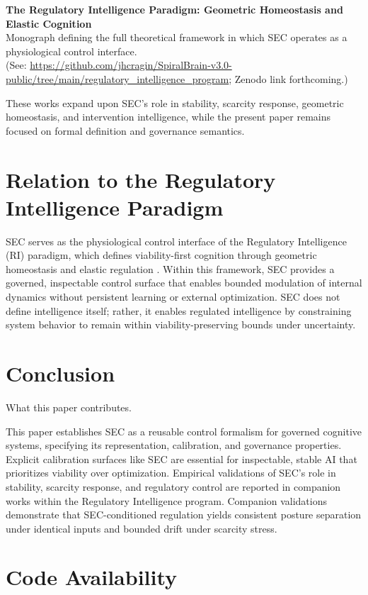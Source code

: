 \documentclass[12pt,a4paper]{article}
\begin{document}
\textbf{The Regulatory Intelligence Paradigm: Geometric Homeostasis and Elastic Cognition} \\
Monograph defining the full theoretical framework in which SEC operates as a physiological control interface. \\
(See: \url{https://github.com/jhcragin/SpiralBrain-v3.0-public/tree/main/regulatory_intelligence_program}; Zenodo link forthcoming.)

These works expand upon SEC's role in stability, scarcity response, geometric homeostasis, and intervention intelligence, while the present paper remains focused on formal definition and governance semantics.

\section{Relation to the Regulatory Intelligence Paradigm}

SEC serves as the physiological control interface of the Regulatory Intelligence (RI) paradigm, which defines viability-first cognition through geometric homeostasis and elastic regulation \cite{Cragin2026RI}. Within this framework, SEC provides a governed, inspectable control surface that enables bounded modulation of internal dynamics without persistent learning or external optimization. SEC does not define intelligence itself; rather, it enables regulated intelligence by constraining system behavior to remain within viability-preserving bounds under uncertainty.

\section{Conclusion}

What this paper contributes.

This paper establishes SEC as a reusable control formalism for governed cognitive systems, specifying its representation, calibration, and governance properties. Explicit calibration surfaces like SEC are essential for inspectable, stable AI that prioritizes viability over optimization. Empirical validations of SEC's role in stability, scarcity response, and regulatory control are reported in companion works within the Regulatory Intelligence program. Companion validations demonstrate that SEC-conditioned regulation yields consistent posture separation under identical inputs and bounded drift under scarcity stress.

\section{Code Availability}
\end{document}
